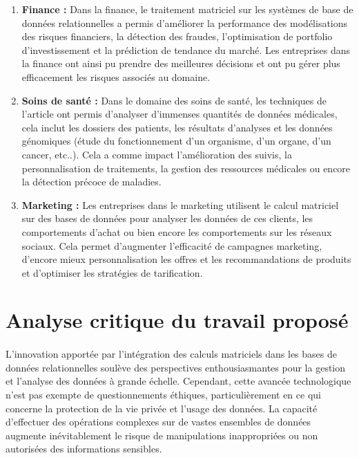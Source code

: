 \documentclass[a4paper, 12pt]{article}
\begin{document}
\begin{enumerate}[label={-}]
	\item \textbf{Finance :} Dans la finance, le traitement matriciel sur les systèmes de base de données relationnelles a permis d'améliorer la performance des modélisations des risques financiers, la détection des fraudes, l'optimisation de portfolio d'investissement et la prédiction de tendance du marché. Les entreprises dans la finance ont ainsi pu prendre des meilleures décisions et ont pu gérer plus efficacement les risques associés au domaine.
	\item \textbf{Soins de santé :} Dans le domaine des soins de santé, les techniques de l'article ont permis d'analyser d'immenses quantités de données médicales, cela inclut les dossiers des patients, les résultats d'analyses et les données génomiques (étude du fonctionnement d'un organisme, d'un organe, d'un cancer, etc..). Cela a comme impact l'amélioration des suivis, la personnalisation de traitements, la gestion des ressources médicales ou encore la détection précoce de maladies.
	\item \textbf{Marketing :} Les entreprises dans le marketing utilisent le calcul matriciel sur des bases de données pour analyser les données de ces clients, les comportements d'achat ou bien encore les comportements sur les réseaux sociaux. Cela permet d'augmenter l'efficacité de campagnes marketing, d'encore mieux personnalisation les offres et les recommandations de produits et d'optimiser les stratégies de tarification.
\end{enumerate}


\clearpage 
\section{Analyse critique du travail proposé}

\paragraph{}
L'innovation apportée par l'intégration des calculs matriciels dans les bases de données relationnelles soulève des perspectives enthousiasmantes pour la gestion et l'analyse des données à grande échelle. Cependant, cette avancée technologique n'est pas exempte de questionnements éthiques, particulièrement en ce qui concerne la protection de la vie privée et l'usage des données. La capacité d'effectuer des opérations complexes sur de vastes ensembles de données augmente inévitablement le risque de manipulations inappropriées ou non autorisées des informations sensibles.
\end{document}
